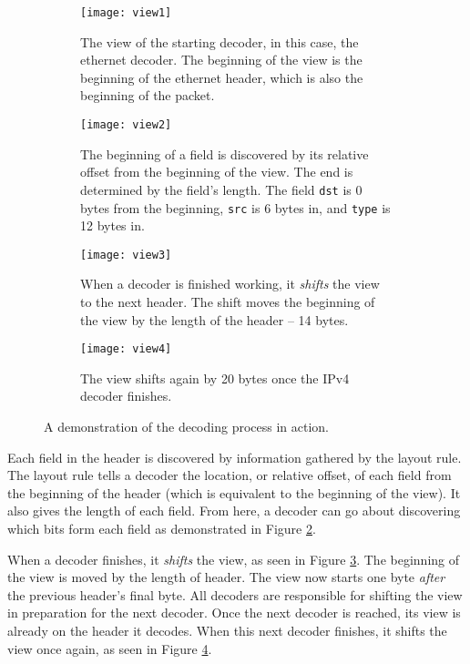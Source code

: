 \begin{figure}[ht]
\begin{subfigure}[t]{.45\textwidth}
  \centering
  \texttt{[image: view1]}
  \caption{The view of the starting decoder, in this case, the ethernet
decoder. The beginning of the view is the beginning of the ethernet
header, which is also the beginning of the packet.}
  \label{fg:view1}
\end{subfigure}%
\hfill
\begin{subfigure}[t]{.45\textwidth}
  \centering
  \texttt{[image: view2]}
  \caption{The beginning of a field is discovered by its relative offset from
the beginning of the view. The end is determined by the field's length. The
field \texttt{dst} is 0 bytes from the beginning, \texttt{src} is 6 bytes in,
and \texttt{type} is 12 bytes in.}
  \label{fg:view2}
\end{subfigure}

\begin{subfigure}[t]{.45\textwidth}
  \centering
  \texttt{[image: view3]}
  \caption{When a decoder is finished working, it \textit{shifts} the view to
the next header. The shift moves the beginning of the view by the length of the
header -- 14 bytes.}
  \label{fg:view3}
\end{subfigure}%
\hfill
\begin{subfigure}[t]{.45\textwidth}
  \centering
  \texttt{[image: view4]}
  \caption{The view shifts again by 20 bytes once the IPv4 decoder finishes.}
  \label{fg:view4}
\end{subfigure}
\caption{A demonstration of the decoding process in action.}
\label{fg:decoding}
\end{figure}

Each field in the header is discovered by information gathered by the layout
rule. The layout rule tells a decoder the location, or relative offset, of
each field from the beginning of the header (which is equivalent to the
beginning of the view). It also gives the length of each
field. From here, a decoder can go about discovering which bits form each
field as demonstrated in Figure \ref{fg:view2}.

When a decoder finishes, it \textit{shifts} the view, as seen in Figure
\ref{fg:view3}. The beginning of the view is moved by the length of header. The
view now starts one byte \textit{after} the previous header's final byte. All decoders are responsible for shifting the view in
preparation for the next decoder. Once the next decoder is reached, its view is
already on the header it decodes. When this next decoder finishes, it shifts the
view once again, as seen in Figure \ref{fg:view4}.

